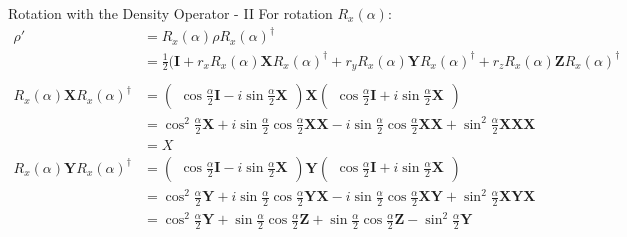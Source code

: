 \documentclass{beamer}
\begin{document}
\begin{frame}{Rotation with the Density Operator - II}
  {\tiny
    For rotation $R_x(\alpha)$:
    \begin{align*}
      \rho' &= R_x(\alpha) \rho R_x(\alpha)^{\dagger} \\
            &= \frac{1}2(\mathbf{I}  + r_x R_x(\alpha) \mathbf{X} R_x(\alpha)^{\dagger}
                                     + r_y R_x(\alpha) \mathbf{Y} R_x(\alpha)^{\dagger}
                                     + r_z R_x(\alpha) \mathbf{Z} R_x(\alpha)^{\dagger} \\
      \\
      R_x(\alpha) \mathbf{X} R_x(\alpha)^{\dagger}
            &=  \begin{pmatrix} \cos\frac{\alpha}2\mathbf{I} - i\sin\frac{\alpha}2 \mathbf{X} \end{pmatrix}
                \mathbf{X}
                \begin{pmatrix} \cos\frac{\alpha}2\mathbf{I} + i\sin\frac{\alpha}2 \mathbf{X} \end{pmatrix} \\
            &=    \cos^2\frac{\alpha}2 \mathbf{X}
                + i\sin\frac{\alpha}2 \cos\frac{\alpha}2 \mathbf{X}\mathbf{X}
                - i\sin\frac{\alpha}2 \cos\frac{\alpha}2 \mathbf{X}\mathbf{X}
                + \sin^2\frac{\alpha}2 \mathbf{X}\mathbf{X}\mathbf{X} \\
            &= X \\
      R_x(\alpha) \mathbf{Y} R_x(\alpha)^{\dagger}
            &=  \begin{pmatrix} \cos\frac{\alpha}2\mathbf{I} - i\sin\frac{\alpha}2 \mathbf{X} \end{pmatrix}
                \mathbf{Y}
                \begin{pmatrix} \cos\frac{\alpha}2\mathbf{I} + i\sin\frac{\alpha}2 \mathbf{X} \end{pmatrix} \\
            &=    \cos^2\frac{\alpha}2 \mathbf{Y}
                + i\sin\frac{\alpha}2 \cos\frac{\alpha}2 \mathbf{Y}\mathbf{X}
                - i\sin\frac{\alpha}2 \cos\frac{\alpha}2 \mathbf{X}\mathbf{Y}
                + \sin^2\frac{\alpha}2 \mathbf{X}\mathbf{Y}\mathbf{X} \\
            &=    \cos^2\frac{\alpha}2 \mathbf{Y}
                + \sin\frac{\alpha}2 \cos\frac{\alpha}2 \mathbf{Z}
                + \sin\frac{\alpha}2 \cos\frac{\alpha}2 \mathbf{Z}
                - \sin^2\frac{\alpha}2 \mathbf{Y} \\

\end{align*}}
\end{frame}
\end{document}
